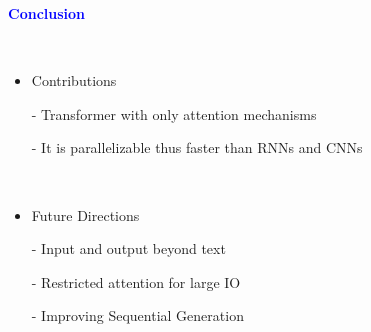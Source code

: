 \documentclass[professionalfont]{beamer}
\begin{document}
\begin{frame}

\begin{center}
    { \textbf{\textcolor{blue}{ {\fontsize{12}{14}\selectfont Conclusion} }} }
\end{center}
\\[0.3cm]

{\fontsize{10}{14}\selectfont 
\begin{itemize}
    \item Contributions
    
    - Transformer with only attention mechanisms

    - It is parallelizable thus faster than RNNs and CNNs

    \\[0.5cm]

    \item Future Directions

    - Input and output beyond text

    - Restricted attention for large IO

    - Improving Sequential Generation 
\end{itemize}
}

\end{frame}
\end{document}
